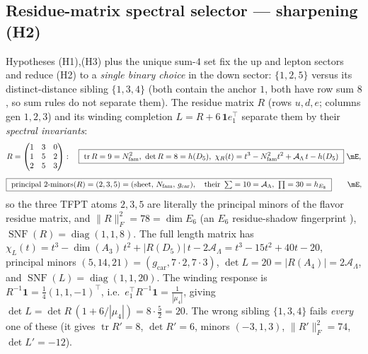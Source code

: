 \documentclass[11pt,a4paper]{article}
\newcommand{\gcar}{g_{\mathrm{car}}}
\newcommand{\Nfam}{N_{\mathrm{fam}}}
\newcommand{\AL}{\mathcal A_\Lambda}
\theoremstyle{definition}
\begin{document}
\subsection{Residue-matrix spectral selector --- sharpening (H2)}
Hypotheses (H1),(H3) plus the unique sum-$4$ set fix the up and lepton sectors and reduce (H2) to a
\emph{single binary choice} in the down sector: $\{1,2,5\}$ versus its distinct-distance sibling
$\{1,3,4\}$ (both contain the anchor $1$, both have row sum $8$, so sum rules do not separate them). The
residue matrix $R$ (rows $u,d,e$; columns gen $1,2,3$) and its winding completion $L=R+6\,\mathbf 1 e_1^{\!\top}$
separate them by their \emph{spectral invariants}:
\begin{equation}
  R=\begin{pmatrix}1&3&0\\1&5&2\\2&5&3\end{pmatrix}:\quad
  \boxed{\ \operatorname{tr}R=9=\Nfam^2,\ \det R=8=h(D_5),\ \chi_R(t)=t^3-\Nfam^2t^2+\AL\,t-h(D_5)\ }\ \mE ,
\end{equation}
\begin{equation}
  \boxed{\ \text{principal $2$-minors}(R)=(2,3,5)=(\text{sheet},\,\Nfam,\,\gcar),\quad
  \text{their }\textstyle\sum=10=\AL,\ \prod=30=h_{E_8}\ }\qquad\mE ,
\end{equation}
so the three TFPT atoms $2,3,5$ are literally the principal minors of the flavor residue matrix, and
$\|R\|_F^2=78=\dim E_6$ (an $E_6$ residue-shadow fingerprint \mO), $\operatorname{SNF}(R)=\operatorname{diag}(1,1,8)$.
The full length matrix has $\chi_L(t)=t^3-\dim(A_3)\,t^2+|R(D_5)|\,t-2\AL=t^3-15t^2+40t-20$, principal
minors $(5,14,21)=(\gcar,7\!\cdot\!2,7\!\cdot\!3)$, $\det L=20=|R(A_4)|=2\AL$, and
$\operatorname{SNF}(L)=\operatorname{diag}(1,1,20)$. The winding response is
$R^{-1}\mathbf 1=\tfrac14(1,1,-1)^{\!\top}$, i.e.\ $e_1^{\!\top}R^{-1}\mathbf 1=\tfrac1{|\mu_4|}$, giving
$\det L=\det R\,(1+6/|\mu_4|)=8\cdot\tfrac52=20$. The wrong sibling $\{1,3,4\}$ fails \emph{every} one of
these (it gives $\operatorname{tr}R'=8$, $\det R'=6$, minors $(-3,1,3)$, $\|R'\|_F^2=74$, $\det L'=-12$).
\end{document}
